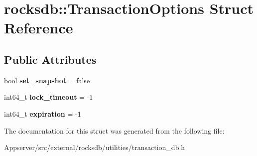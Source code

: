 \hypertarget{structrocksdb_1_1TransactionOptions}{}\section{rocksdb\+:\+:Transaction\+Options Struct Reference}
\label{structrocksdb_1_1TransactionOptions}
\subsection*{Public Attributes}
\begin{DoxyCompactItemize}
\item 
bool {\bfseries set\+\_\+snapshot} = false\hypertarget{structrocksdb_1_1TransactionOptions_a46665de0e08f03d894dbc293ad651a77}{}\label{structrocksdb_1_1TransactionOptions_a46665de0e08f03d894dbc293ad651a77}

\item 
int64\+\_\+t {\bfseries lock\+\_\+timeout} = -\/1\hypertarget{structrocksdb_1_1TransactionOptions_afe09d12bd93e141f1eb17e714830defa}{}\label{structrocksdb_1_1TransactionOptions_afe09d12bd93e141f1eb17e714830defa}

\item 
int64\+\_\+t {\bfseries expiration} = -\/1\hypertarget{structrocksdb_1_1TransactionOptions_ada358d526418d95d95ce8d1c5f9d6bd9}{}\label{structrocksdb_1_1TransactionOptions_ada358d526418d95d95ce8d1c5f9d6bd9}

\end{DoxyCompactItemize}


The documentation for this struct was generated from the following file\+:\begin{DoxyCompactItemize}
\item 
Appserver/src/external/rocksdb/utilities/transaction\+\_\+db.\+h\end{DoxyCompactItemize}
